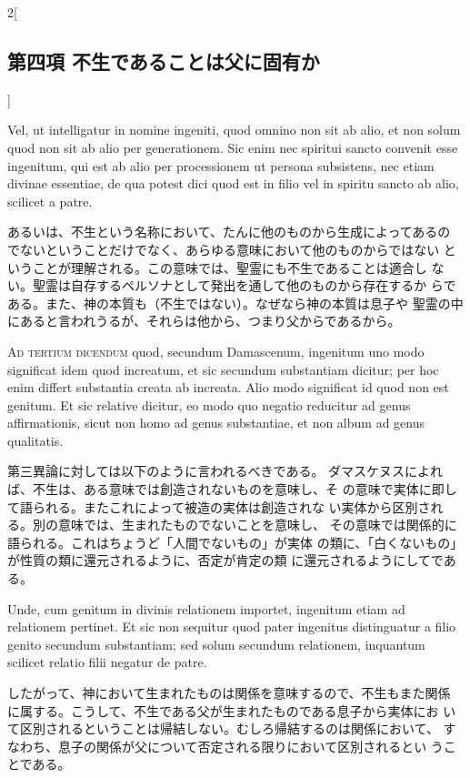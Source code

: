 \documentclass[paper=a4paper,fontsize=10pt,jafontsize=9pt,titlepage]{jlreq}
\begin{document}
\begin{paracol}{2}[\subsection{第四項 不生であることは父に固有か}]
\switchcolumn*


Vel, ut
intelligatur in nomine ingeniti, quod omnino non sit ab alio, et non
solum quod non sit ab alio per generationem. Sic enim nec spiritui
sancto convenit esse ingenitum, qui est ab alio per processionem ut
persona subsistens, nec etiam divinae essentiae, de qua potest dici
quod est in filio vel in spiritu sancto ab alio, scilicet a patre.


\switchcolumn


あるいは、不生という名称において、たんに他のものから生成によってあるの
 でないということだけでなく、あらゆる意味において他のものからではない
 ということが理解される。この意味では、聖霊にも不生であることは適合し
 ない。聖霊は自存するペルソナとして発出を通して他のものから存在するか
 らである。また、神の本質も（不生ではない）。なぜなら神の本質は息子や
 聖霊の中にあると言われうるが、それらは他から、つまり父からであるから。


\switchcolumn*[\subsection{ad.3}]


{\scshape Ad tertium dicendum} quod, secundum Damascenum, ingenitum uno modo
significat idem quod increatum, et sic secundum substantiam dicitur;
per hoc enim differt substantia creata ab increata. Alio modo
significat id quod non est genitum. Et sic relative dicitur, eo modo
quo negatio reducitur ad genus affirmationis, sicut non homo ad genus
substantiae, et non album ad genus qualitatis.


\switchcolumn


第三異論に対しては以下のように言われるべきである。
ダマスケヌスによれば、不生は、ある意味では創造されないものを意味し、そ
 の意味で実体に即して語られる。またこれによって被造の実体は創造されな
 い実体から区別される。別の意味では、生まれたものでないことを意味し、
 その意味では関係的に語られる。これはちょうど「人間でないもの」が実体
 の類に、「白くないもの」が性質の類に還元されるように、否定が肯定の類
 に還元されるようにしてである。


\switchcolumn*


Unde, cum genitum in
divinis relationem importet, ingenitum etiam ad relationem
pertinet. Et sic non sequitur quod pater ingenitus distinguatur a
filio genito secundum substantiam; sed solum secundum relationem,
inquantum scilicet relatio filii negatur de patre.


\switchcolumn


したがって、神において生まれたものは関係を意味するので、不生もまた関係
 に属する。こうして、不生である父が生まれたものである息子から実体にお
 いて区別されるということは帰結しない。むしろ帰結するのは関係において、
 すなわち、息子の関係が父について否定される限りにおいて区別されるとい
 うことである。



\end{paracol}
\end{document}
